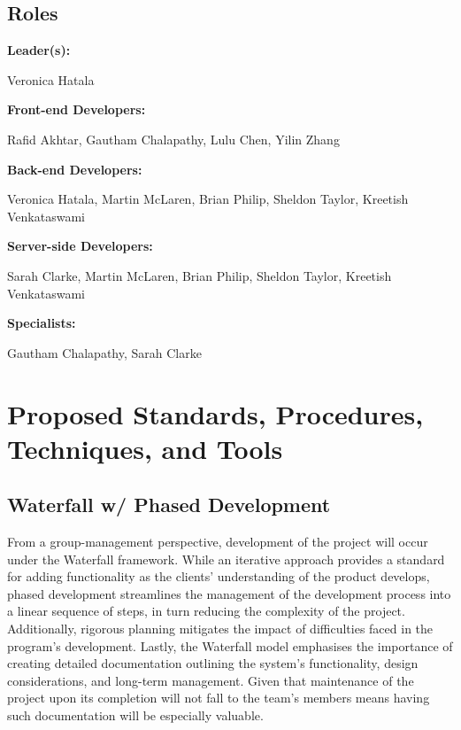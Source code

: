 \documentclass[11pt]{article}
\begin{document}
\subsection{Roles}
\textbf{Leader(s):}
\begin{addmargin}[1em]{2em} Veronica Hatala \end{addmargin}\vspace{2mm}
\textbf{Front-end Developers:}
\begin{addmargin}[1em]{2em} Rafid Akhtar, Gautham Chalapathy, Lulu Chen, Yilin Zhang
\end{addmargin}\vspace{2mm}
\textbf{Back-end Developers:}
\begin{addmargin}[1em]{2em} Veronica Hatala, Martin McLaren, Brian Philip, Sheldon Taylor, Kreetish
Venkataswami
\end{addmargin}\vspace{2mm}
\textbf{Server-side Developers:}
\begin{addmargin}[1em]{2em} Sarah Clarke, Martin McLaren, Brian Philip, Sheldon Taylor, Kreetish
Venkataswami
\end{addmargin}\vspace{2mm}
\textbf{Specialists:}
\begin{addmargin}[1em]{2em} Gautham Chalapathy, Sarah Clarke \end{addmargin}\vspace{2mm}

\section{Proposed Standards, Procedures, Techniques, and Tools}
\subsection{Waterfall w/ Phased Development}
From a group-management perspective, development of the project will occur under the Waterfall
framework. While an iterative approach provides a standard for adding functionality as the clients'
understanding of the product develops, phased development streamlines the management of the
development process into a linear sequence of steps, in turn reducing the complexity of the project.
Additionally, rigorous planning mitigates the impact of difficulties faced in the program's
development. Lastly, the Waterfall model emphasises the importance of creating detailed
documentation outlining the system's functionality, design considerations, and long-term management.
Given that maintenance of the project upon its completion will not fall to the team's members means
having such documentation will be especially valuable.
\end{document}
